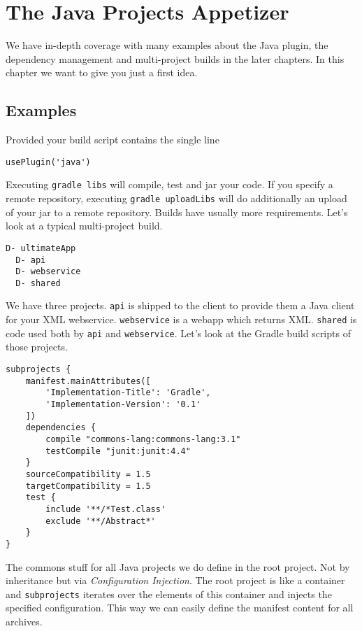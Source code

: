 \chapter{The Java Projects Appetizer} %
\label{cha:the_java_projects_tutorial}
We have in-depth coverage with many examples about the Java plugin, the dependency management and multi-project builds in the later chapters. In this chapter we want to give you just a first idea.

\section{Examples} %
\label{sec:examples}
Provided your build script contains the single line
\begin{Verbatim}
usePlugin('java')
\end{Verbatim}
Executing \texttt{gradle libs} will compile, test and jar your code. If you specify a remote repository, executing \texttt{gradle uploadLibs} will do additionally an upload of your jar to a remote repository.
Builds have usually more requirements. Let's look at a typical multi-project build.

\begin{Verbatim}[frame=single,label=Project Tree]
D- ultimateApp
  D- api
  D- webservice
  D- shared
\end{Verbatim}
We have three projects. \texttt{api} is shipped to the client to provide them a Java client for your XML webservice. \texttt{webservice} is a webapp which returns XML. \texttt{shared} is code used both by \texttt{api} and \texttt{webservice}. Let's look at the Gradle build scripts of those projects.

\begin{Verbatim}[frame=single,label=ultimateApp]
subprojects {
    manifest.mainAttributes([
	    'Implementation-Title': 'Gradle',
		'Implementation-Version': '0.1'
	])
	dependencies {
		compile "commons-lang:commons-lang:3.1"
		testCompile "junit:junit:4.4"
	}
	sourceCompatibility = 1.5
	targetCompatibility = 1.5
	test {
	    include '**/*Test.class'
	    exclude '**/Abstract*'
	}
}
\end{Verbatim}
The commons stuff for all Java projects we do define in the root project. Not by inheritance but via \emph{Configuration Injection}. The root project is like a container and \texttt{subprojects} iterates over the elements of this container and injects the specified configuration. This way we can easily define the manifest content for all archives.

